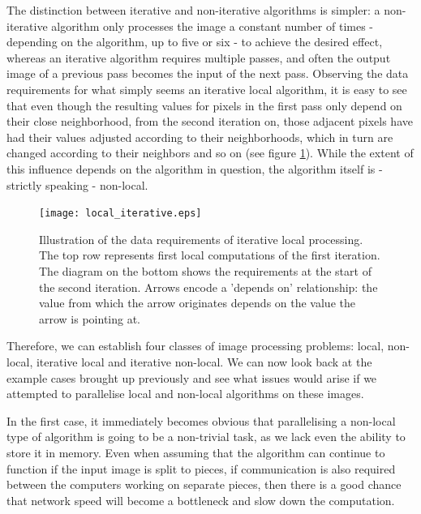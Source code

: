 \documentclass [12pt,a4paper]{report}
\begin{document}
The distinction between iterative and non-iterative algorithms is simpler: a non-iterative algorithm only processes the image a constant number of times - depending on the algorithm, up to five or six - to achieve the desired effect, whereas an iterative algorithm requires multiple passes, and often the output image of a previous pass becomes the input of the next pass. Observing the data requirements for what simply seems an iterative local algorithm, it is easy to see that even though the resulting values for pixels in the first pass only depend on their close neighborhood, from the second iteration on, those adjacent pixels have had their values adjusted according to their neighborhoods, which in turn are changed according to their neighbors and so on (see figure \ref{fig_local_iterative}). While the extent of this influence depends on the algorithm in question, the algorithm itself is - strictly speaking - non-local.

\begin{figure}[h]
\begin{center}
\texttt{[image: local\_iterative.eps]} %
\caption{Illustration of the data requirements of iterative local processing. The top row represents first local computations of the first iteration. The diagram on the bottom shows the requirements at the start of the second iteration. Arrows encode a 'depends on' relationship: the value from which the arrow originates depends on the value the arrow is pointing at.}
\label{fig_local_iterative}
\end{center}
\end{figure}

Therefore, we can establish four classes of image processing problems: local, non-local, iterative local and iterative non-local. We can now look back at the example cases brought up previously and see what issues would arise if we attempted to parallelise local and non-local algorithms on these images.

In the first case, it immediately becomes obvious that parallelising a non-local type of algorithm is going to be a non-trivial task, as we lack even the ability to store it in memory. Even when assuming that the algorithm can continue to function if the input image is split to pieces, if communication is also required between the computers working on separate pieces, then there is a good chance that network speed will become a bottleneck and slow down the computation.
\end{document}
